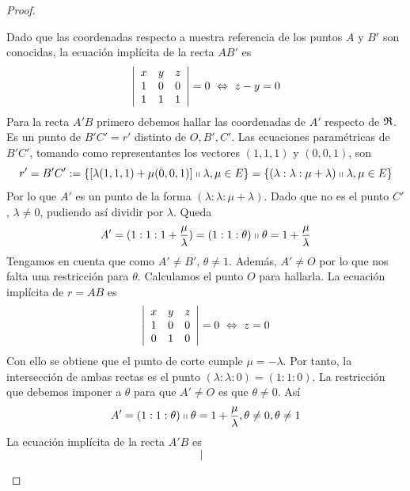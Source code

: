 \begin{proof}
\begin{itemize}
		Dado que las coordenadas respecto a nuestra referencia de los puntos $A$ y $B'$ son conocidas, la ecuación implícita de la recta $AB'$ es
		\begin{equation*}
			\left| \begin{array}{ccc}
				x & y & z\\
				1 & 0 & 0\\
				1 & 1 & 1
			\end{array}\right| =0 \ \Leftrightarrow \ z-y=0
		\end{equation*}
		Para la recta $ A'B$ primero debemos hallar las coordenadas de $A'$ respecto de $\mathfrak{R}$. Es un punto de $B'C'=r'$ distinto de $O,B',C'$. Las ecuaciones paramétricas de $B'C'$, tomando como representantes los vectores $(1,1,1)$ y $(0,0,1)$, son
		\begin{equation}
			\label{C3_papus_eqparam_r}
			r'=B'C':=\{[\lambda(1,1,1)+\mu(0,0,1)]\shortparallel \lambda,\mu\in E\}=\{(\lambda:\lambda:\mu+\lambda)\shortparallel \lambda,\mu\in E\}
		\end{equation}
		Por lo que $A'$ es un punto de la forma $(\lambda:\lambda:\mu+\lambda)$. Dado que no es el punto $C'$, $\lambda\not=0$, pudiendo así dividir por $\lambda$. Queda
		\begin{equation*}
			A'=(1:1:1+\frac{\mu}{\lambda})=(1:1:\theta)\shortparallel \theta=1+\frac{\mu}{\lambda}
		\end{equation*}
		Tengamos en cuenta que como $A'\not=B'$, $\theta\not=1$. Además, $A'\not=O$ por lo que nos falta una restricción para $\theta$. Calculamos el punto $O$ para hallarla. La ecuación implícita de $r=AB$ es 
		\begin{equation*}
			\left| \begin{array}{ccc}
				x & y & z\\
				1 & 0 & 0\\
				0 & 1 & 0
			\end{array}\right| =0 \ \Leftrightarrow \ z=0
		\end{equation*}
		Con ello se obtiene que el punto de corte cumple $\mu=-\lambda$. Por tanto, la intersección de ambas rectas es el punto $(\lambda:\lambda:0)=(1:1:0)$. La restricción que debemos imponer a $\theta$ para que $A'\not=O$ es que $\theta\not=0$. Así
		\begin{equation*}
			A'=(1:1:\theta)\shortparallel \theta=1+\frac{\mu}{\lambda}, \theta\not=0, \theta\not=1
		\end{equation*}
		La ecuación implícita de la recta $A'B$ es
		\begin{equation*}
			\left| \begin{array}{ccc}

\end{array}
\end{equation*}
\end{itemize}
\end{proof}
